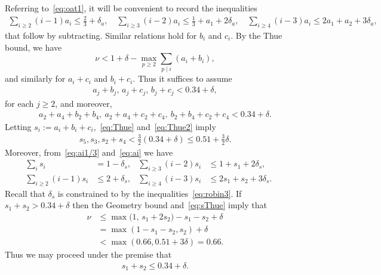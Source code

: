 Referring to~\eqref{eq:oat1}, it will be convenient to record the inequalities
\begin{align}\label{eq:ai}
\sum_{i\ge2} (i-1)a_i \le \frac{2}{3}+\delta_a, \quad \sum_{i\ge3} (i-2)a_i\le\frac{1}{3}+a_1 + 2\delta_a, \quad
\sum_{i\ge4}(i-3)a_i \le 2a_1+a_2+3\delta_a,
\end{align}
that follow by subtracting. Similar relations hold for $b_i$ and $c_i$.
By the Thue bound, we have
\[
\nu < 1 +\delta- \max_{p\ge2}\sum_{p\mid i} (a_i+b_i),
\]
and similarly for $a_i+c_i$ and $b_i+c_i$. Thus it suffices to assume
\begin{align}\label{eq:Thue}
a_j+b_j, \,a_j+c_j,\, b_j+c_j < 0.34+\delta,
\end{align}
for each $j\geq 2$, and moreover,
\begin{align}\label{eq:Thue2}
a_2+a_4+b_2+b_4, \ a_2+a_4+c_2+c_4, \
b_2+b_4+c_2+c_4 < 0.34+\delta.
\end{align}
Letting $s_i :=a_i+b_i+c_i$,~\eqref{eq:Thue} and~\eqref{eq:Thue2} imply
\begin{align}\label{eq:sThue}
s_5,s_3,s_2+s_4 < \frac{3}{2}(0.34+\delta)\le 0.51+\frac{3}{2}\delta.
\end{align}
Moreover, from~\eqref{eq:ai1/3} and~\eqref{eq:ai} we have
\begin{align*}
\sum_i s_i &= 1-\delta_s, &
\sum_{i\ge 3}(i-2)s_i & \le 1 + s_1 + 2\delta_s, \\
\sum_{i\ge2} (i-1)s_i&\le 2 + \delta_s, & \sum_{i\ge4}(i-3)s_i & \le 2s_1+s_2 + 3\delta_s.& & \end{align*}
Recall that $\delta_s$ is constrained to by the inequalities~\eqref{eq:robin3}.
If $s_1+s_2> 0.34+\delta$ then the Geometry bound and~\eqref{eq:sThue} imply that
\begin{align*}
\nu & \le \max\big(1,\, s_1+2s_2\big) -s_1-s_2 + \delta
\\
& = \max(1-s_1-s_2, s_2) +\delta\\
&< \max\left(0.66, 0.51+3\delta\right) = 0.66.
\end{align*}
Thus we may proceed under the premise that
\begin{align}\label{eq:s_1+s_2<0.34}
s_1+s_2\leq 0.34 +\delta.
\end{align}


